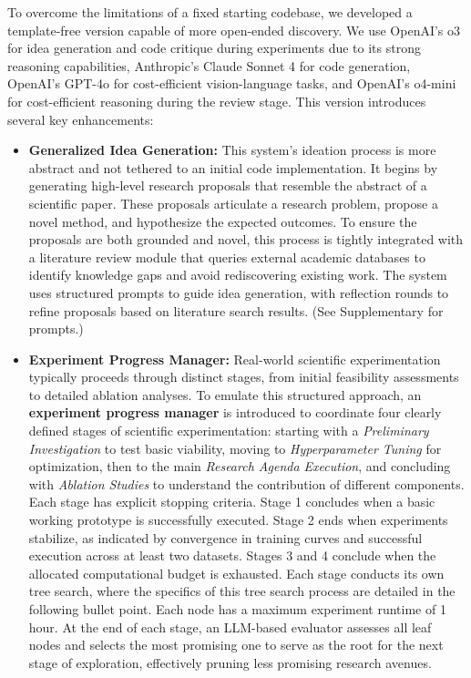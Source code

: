 To overcome the limitations of a fixed starting codebase, we developed a template-free version capable of more open-ended discovery.
We use OpenAI's o3 for idea generation and code critique during experiments due to its strong reasoning capabilities, Anthropic's Claude Sonnet 4 for code generation, OpenAI's GPT-4o for cost-efficient vision-language tasks, and OpenAI's o4-mini for cost-efficient reasoning during the review stage.
This version introduces several key enhancements:
\begin{itemize}
    \item \textbf{Generalized Idea Generation:} This system's ideation process is more abstract and not tethered to an initial code implementation. It begins by generating high-level research proposals that resemble the abstract of a scientific paper. These proposals articulate a research problem, propose a novel method, and hypothesize the expected outcomes. To ensure the proposals are both grounded and novel, this process is tightly integrated with a literature review module that queries external academic databases to identify knowledge gaps and avoid rediscovering existing work. The system uses structured prompts to guide idea generation, with reflection rounds to refine proposals based on literature search results.
    (See Supplementary  for prompts.)

    \item
    \textbf{Experiment Progress Manager:}
    Real-world scientific experimentation typically proceeds through distinct stages, from initial feasibility assessments to detailed ablation analyses. To emulate this structured approach, an \textbf{experiment progress manager} is introduced to coordinate four clearly defined stages of scientific experimentation:
    starting with a \textit{Preliminary Investigation} to test basic viability, moving to \textit{Hyperparameter Tuning} for optimization, then to the main \textit{Research Agenda Execution}, and concluding with \textit{Ablation Studies} to understand the contribution of different components.
    Each stage has explicit stopping criteria. Stage 1 concludes when a basic working prototype is successfully executed. Stage 2 ends when experiments stabilize, as indicated by convergence in training curves and successful execution across at least two datasets. Stages 3 and 4 conclude when the allocated computational budget is exhausted.
    Each stage conducts its own tree search, where the specifics of this tree search process are detailed in the following bullet point.
    Each node has a maximum experiment runtime of 1 hour. At the end of each stage, an LLM-based evaluator assesses all leaf nodes and selects the most promising one to serve as the root for the next stage of exploration, effectively pruning less promising research avenues.


\end{itemize}
